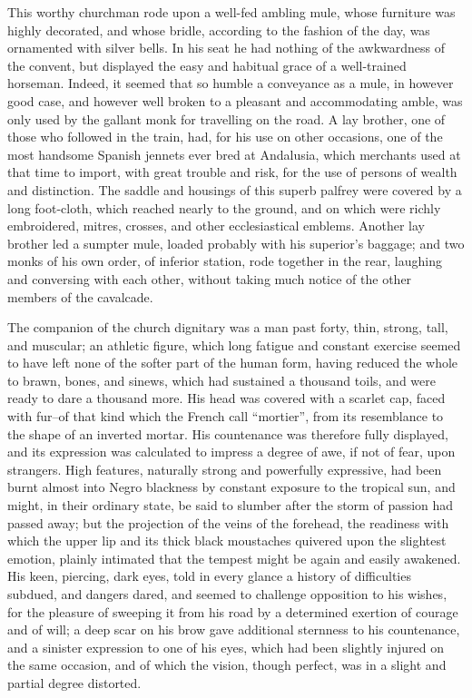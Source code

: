 This worthy churchman rode upon a well-fed ambling mule, whose furniture
was highly decorated, and whose bridle, according to the fashion of the
day, was ornamented with silver bells. In his seat he had nothing of the
awkwardness of the convent, but displayed the easy and habitual grace of
a well-trained horseman. Indeed, it seemed that so humble a conveyance
as a mule, in however good case, and however well broken to a pleasant
and accommodating amble, was only used by the gallant monk for
travelling on the road. A lay brother, one of those who followed in the
train, had, for his use on other occasions, one of the most handsome
Spanish jennets ever bred at Andalusia, which merchants used at that
time to import, with great trouble and risk, for the use of persons of
wealth and distinction. The saddle and housings of this superb palfrey
were covered by a long foot-cloth, which reached nearly to the ground,
and on which were richly embroidered, mitres, crosses, and other
ecclesiastical emblems. Another lay brother led a sumpter mule, loaded
probably with his superior's baggage; and two monks of his own order, of
inferior station, rode together in the rear, laughing and conversing
with each other, without taking much notice of the other members of the
cavalcade.

The companion of the church dignitary was a man past forty, thin,
strong, tall, and muscular; an athletic figure, which long fatigue and
constant exercise seemed to have left none of the softer part of the
human form, having reduced the whole to brawn, bones, and sinews, which
had sustained a thousand toils, and were ready to dare a thousand more.
His head was covered with a scarlet cap, faced with fur--of that kind
which the French call ``mortier'', from its resemblance to the shape of
an inverted mortar. His countenance was therefore fully displayed, and
its expression was calculated to impress a degree of awe, if not of
fear, upon strangers. High features, naturally strong and powerfully
expressive, had been burnt almost into Negro blackness by constant
exposure to the tropical sun, and might, in their ordinary state, be
said to slumber after the storm of passion had passed away; but the
projection of the veins of the forehead, the readiness with which the
upper lip and its thick black moustaches quivered upon the slightest
emotion, plainly intimated that the tempest might be again and easily
awakened. His keen, piercing, dark eyes, told in every glance a history
of difficulties subdued, and dangers dared, and seemed to challenge
opposition to his wishes, for the pleasure of sweeping it from his road
by a determined exertion of courage and of will; a deep scar on his brow
gave additional sternness to his countenance, and a sinister expression
to one of his eyes, which had been slightly injured on the same
occasion, and of which the vision, though perfect, was in a slight and
partial degree distorted.

